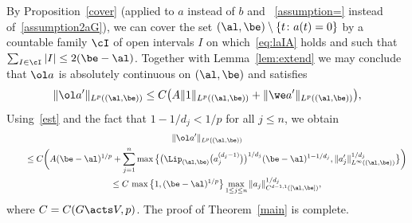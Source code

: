  By Proposition~\ref{cover} (applied to $a$ instead of $b$ and
~\eqref{assumption=} instead of~\eqref{assumption2aG}),
 we can cover the set
 $(\al,\be) \setminus \{t \colon a(t) = 0\}$
by a countable family $\cI$ of open intervals $I$ on which~\eqref{eq:laIA} holds and such that
$\sum_{I \in \cI} |I| \le 2 (\be - \al)$.
Together with Lemma~\ref{lem:extend} we may conclude that
$\ol a$ is absolutely continuous on $(\al,\be)$ and satisfies
\begin{gather*}
 \|\ol a'\|_{L^p((\al,\be))} \le C \big(A \|1\|_{L^p((\al,\be))}
 + \|\we a'\|_{L^p ((\al,\be))}\big),
\end{gather*}
Using~\eqref{est} and the fact that $1 - 1/d_j < 1/p$ for all $j \le n$, we obtain
\begin{gather*}
 \|\ol a'\|_{L^p((\al,\be))}
 \\ \qquad
{} \le C \bigg(A (\be - \al)^{1/p}
+ \sum_{j=1}^n \max \big\{\big (\Lip_{(\al,\be)}\big( a_j^{(d_j-1)}\big)\big)^{1/d_j} (\be -\al)^{1-1/d_j}, \|a_j'\|^{1/d_j}_{L^\infty((\al,\be))}
 \big\} \bigg)
 \\ \qquad
{}\le C\, \max\big\{1, (\be-\al)^{1/p} \big\} \max_{1 \le j \le n} \|a_j\|^{1/d_j}_{C^{d-1,1}([\al, \be])},
\end{gather*}
where $C = C(G \acts V,p)$.
The proof of Theorem~\ref{main} is complete.
